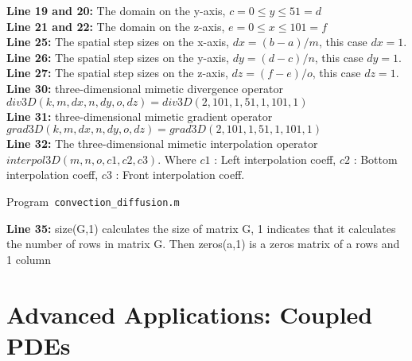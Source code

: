 \textbf{Line 19 and 20:} The domain on the  y-axis, $c=0 \leq y \leq 51=d$\\

\textbf{Line 21 and 22:} The domain on the  z-axis, $e=0 \leq x \leq 101=f$\\

\textbf{Line 25:} The spatial step sizes on the x-axis, $ dx = (b-a)/m$, this case $dx = 1$.\\

\textbf{Line 26:} The spatial step sizes on the y-axis, $ dy = (d-c)/n$, this case $dy = 1$.\\

\textbf{Line 27:} The spatial step sizes on the z-axis, $ dz = (f-e)/o$, this case $dz = 1$.\\

\textbf{Line 30:} three-dimensional mimetic divergence operator $div3D(k,m,dx,n,dy,o,dz)=div3D(2,101,1,51,1,101,1)$\\

\textbf{Line 31:} three-dimensional mimetic gradient operator $grad3D(k,m,dx,n,dy,o,dz)=grad3D(2,101,1,51,1,101,1)$\\

\textbf{Line 32:} The three-dimensional mimetic interpolation operator
$interpol3D(m, n, o, c1, c2, c3)$.  Where $c1$ : Left interpolation coeff, $c2$ : Bottom interpolation coeff, $c3$ : Front interpolation coeff.\\

\begin{octavelisting}
	\tiny
	\centering
	\caption{Program~\texttt{convection\_diffusion.m}}
	\label{code:convection_diffusion.m}
\end{octavelisting}

\textbf{Line 35:} size(G,1) calculates the size of matrix G, 1 indicates that it calculates the number of rows in matrix G. Then zeros(a,1) is a zeros matrix of a rows and 1 column







\section{Advanced Applications: Coupled PDEs}
